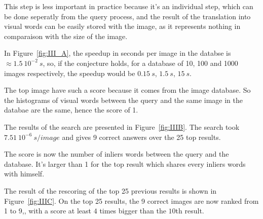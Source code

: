 \documentclass{article}
\begin{document}
This step is less important in practice because it's an individual step, which can be done seperatly from the query process, and the result of the translation into visual words can be easily stored with the image, as it represents nothing in comparaison with the size of the image.


In Figure~\ref{fig:III_A}, the speedup in seconds per image in the databse is \( \approx 1.5~10^{-2}~s\), so, if the conjecture holds, for a database of 10, 100 and 1000 images respectively, the speedup would be \(0.15~s\), \(1.5~s\), \(15~s\).


The top image have such a score because it comes from the image database. So the histograms of visual words between the query and the same image in the databae are the same, hence the score of 1.

The results of the search are presented in Figure~\ref{fig:IIIB}. The search took \( 7.51~10^{-6}~s/image\) and gives 9 correct answers over the 25 top results.


The score is now the number of inliers words between the query and the database. It's larger than 1 for the top result which shares every inliers words with himself.

The result of the rescoring of the top 25 previous results is shown in Figure~\ref{fig:IIIC}. On the top 25 results, the 9 correct images are now ranked from 1 to 9,, with a score at least \( 4\) times bigger than the \(10\)th result.



\end{document}
